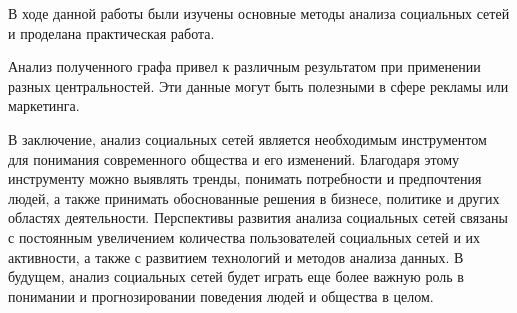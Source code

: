 В ходе данной работы были изучены основные методы анализа социальных сетей и проделана практическая работа.

Анализ полученного графа привел к различным результатом при применении разных центральностей. Эти данные могут быть полезными в сфере рекламы или маркетинга. 

В заключение, анализ социальных сетей является необходимым инструментом для понимания современного общества и его изменений. Благодаря этому инструменту можно выявлять тренды, понимать потребности и предпочтения людей, а также принимать обоснованные решения в бизнесе, политике и других областях деятельности. Перспективы развития анализа социальных сетей связаны с постоянным увеличением количества пользователей социальных сетей и их активности, а также с развитием технологий и методов анализа данных. В будущем, анализ социальных сетей будет играть еще более важную роль в понимании и прогнозировании поведения людей и общества в целом.